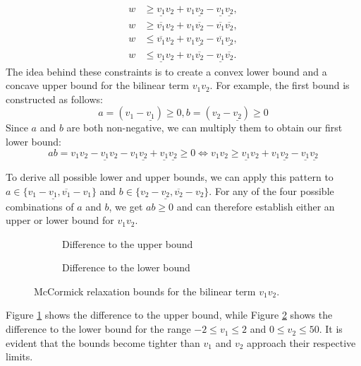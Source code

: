 \[
	\begin{aligned}
		w & \geq \underline{v_1} v_2 + v_1 \underline{v_2} - \underline{v_1} \underline{v_2}, \\
		w & \geq \overline{v_1} v_2 + v_1 \overline{v_2} - \overline{v_1} \overline{v_2},     \\
		w & \leq \overline{v_1} v_2 + v_1 \underline{v_2} - \overline{v_1} \underline{v_2},   \\
		w & \leq \underline{v_1} v_2 + v_1 \overline{v_2} - \underline{v_1} \overline{v_2}.
	\end{aligned}
\]
The idea behind these constraints is to create a convex lower bound and a concave upper bound for the bilinear term $v_1v_2$.
For example, the first bound is constructed as follows: \[ a = (v_1 - \underline{v_1}) \geq 0, b = (v_2 - \underline{v_2}) \geq 0 \] Since $a$ and
$b$ are both non-negative, we can multiply them to obtain our first lower bound: \[ ab = v_1v_2 - \underline{v_1}v_2 - v_1\underline{v_2} +
	\underline{v_1}\underline{v_2} \geq 0 \iff v_1v_2 \geq \underline{v_1}v_2 + v_1\underline{v_2} - \underline{v_1}\underline{v_2} \]

To derive all possible lower and upper bounds, we can apply this pattern to $a \in \{v_1 - \underline{v_1}, \overline{v_1} -
	v_1\}$ and $b \in \{v_2 - \underline{v_2}, \overline{v_2} - v_2\}$.
For any of the four possible combinations of $a$ and $b$, we get $ab \geq 0$ and can therefore establish either an upper or lower bound for $v_1v_2$.

\begin{figure}[h]
	\centering
	\begin{subfigure}[b]{0.45\textwidth}
		\centering
		\resizebox{\textwidth}{!}{}
		\caption{Difference to the upper bound}
		\label{fig:mccormick_0_upper}
	\end{subfigure}
	\hfill
	\begin{subfigure}[b]{0.45\textwidth}
		\centering
		\resizebox{\textwidth}{!}{}
		\caption{Difference to the lower bound}
		\label{fig:mccormick_0_lower}
	\end{subfigure}
	\caption{McCormick relaxation bounds for the bilinear term $ v_1v_2 $.}
	\label{fig:mccormick_bounds_0}
\end{figure}

Figure \ref{fig:mccormick_0_upper} shows the difference to the upper bound, while Figure \ref{fig:mccormick_0_lower} shows the difference to the
lower bound for the range $ -2 \leq v_1 \leq 2 $ and $ 0 \leq v_2 \leq 50 $.
It is evident that the bounds become tighter than $ v_1 $ and $ v_2 $ approach their respective limits.

